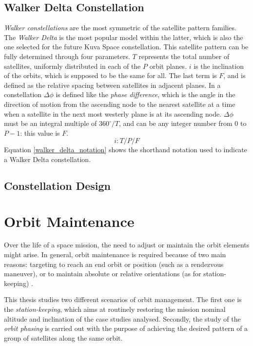 \subsection{Walker Delta Constellation}
\textit{Walker constellations} are the most symmetric of the satellite pattern families.
The \textit{Walker Delta} is the most popular model within the latter, which is also the one selected for the future Kuva Space constellation.
This satellite pattern can be fully determined through four parameters. 
$T$ represents the total number of satellites, uniformly distributed in each of the $P$ orbit planes.
$i$ is the inclination of the orbits, which is supposed to be the same for all.
The last term is $F$, and is defined as the relative spacing between satellites in adjacent planes.
In a constellation $\Delta \phi$ is defined like the \textit{phase difference}, which is the angle in the direction of motion from the ascending node to the nearest satellite at a time when a satellite in the next most westerly plane is at its ascending node.
$\Delta \phi$ must be an integral multiple of $360^\circ / T$, and can be any integer number from $0$ to $P-1$: this value is $F$.
\begin{equation} \label{walker_delta_notation}
    i : T/P/F
\end{equation}
Equation \ref{walker_delta_notation} shows the shorthand notation used to indicate a Walker Delta constellation.

\cite{wertz2009orbit}

\subsection{Constellation Design}

\section{Orbit Maintenance}
Over the life of a space mission, the need to adjust or maintain the orbit elements might arise. In general, orbit maintenance is required because of two main reasons:
 targeting to reach an end orbit or position (such as a rendezvous maneuver), or to maintain absolute or relative orientations (as for station-keeping) \cite{wertz2009orbit}.

This thesis studies two different scenarios of orbit management. 
The first one is the \textit{station-keeping}, which aims at routinely restoring the mission nominal altitude and inclination of the case studies analysed. 
Secondly, the study of the \textit{orbit phasing} is carried out with the purpose of achieving the desired pattern of a group of satellites along the same orbit.


